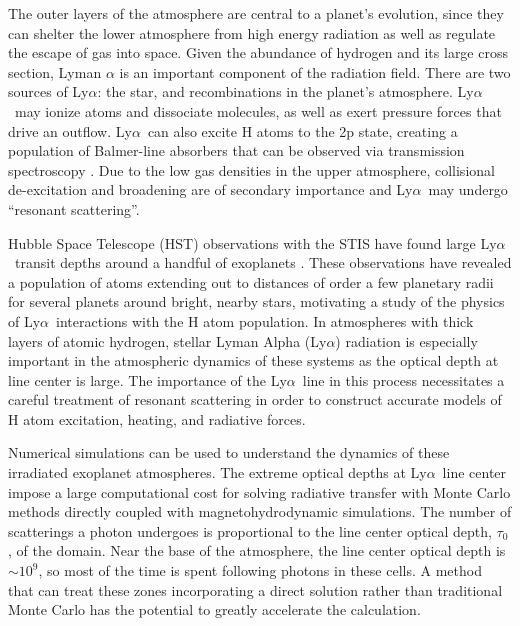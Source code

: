 \documentclass{aastex63}
\newcommand\lya{Ly$\alpha$\ }
\begin{document}
The outer layers of the atmosphere are central to a planet's evolution, since they can shelter the lower atmosphere from high energy radiation as well as regulate the escape of gas into space. Given the abundance of hydrogen and its large cross section, Lyman $\alpha$ is an important component of the radiation field. There are two sources of Ly$\alpha$: the star, and recombinations in the planet's atmosphere. \lya may ionize atoms and dissociate molecules, as well as exert pressure forces that drive an outflow. \lya can also excite H atoms to the 2p state, creating a population of Balmer-line absorbers that can be observed via transmission spectroscopy \citep{2017ApJ...851..150H}. Due to the low gas densities in the upper atmosphere, collisional de-excitation and broadening are of secondary importance and \lya may undergo ``resonant scattering''.

Hubble Space Telescope (HST) observations with the STIS have found large \lya transit depths around a handful of exoplanets \citep{2003Natur.422..143V, 2012A&A...543L...4L, 2012A&A...547A..18E, 2015Natur.522..459E,  2017A&A...597A..26B, 2017A&A...599L...3B, 2017A&A...602A.106B, 2018A&A...620A.147B, 2019AJ....158...50W, 2019EPSC...13.1928L, 2020ApJ...888L..21G,2021arXiv210309864B}. These observations have revealed a population of atoms extending out to distances of order a few planetary radii for several planets around bright, nearby stars, motivating a study of the physics of \lya interactions with the H atom population. In atmospheres with thick layers of atomic hydrogen, stellar Lyman Alpha (Ly$\alpha$) radiation is especially important in the atmospheric dynamics of these systems as the optical depth at line center is large. The importance of the \lya line in this process necessitates a careful treatment of resonant scattering in order to construct accurate models of H atom excitation, heating, and radiative forces. 

Numerical simulations can be used to understand the dynamics of these irradiated exoplanet atmospheres. The extreme optical depths at \lya line center impose a large computational cost for solving radiative transfer with Monte Carlo methods directly coupled with magnetohydrodynamic simulations. The number of scatterings a photon undergoes is proportional to the line center optical depth, $\tau_0$, of the domain.  Near the base of the atmosphere, the line center optical depth is ${\sim}10^9$, so most of the time is spent following photons in these cells. A method that can treat these zones incorporating a direct solution rather than traditional Monte Carlo has the potential to greatly accelerate the calculation.
\end{document}
